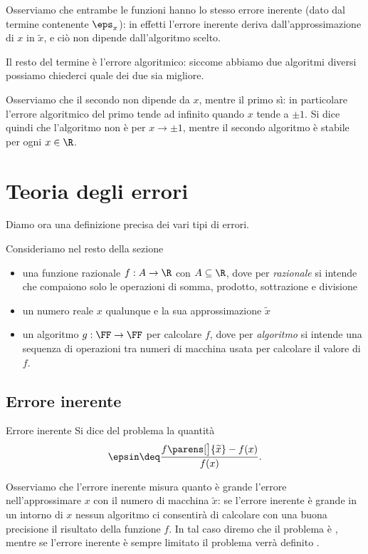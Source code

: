 \begin{example}
Osserviamo che entrambe le funzioni hanno lo stesso errore inerente (dato dal termine contenente $\eps_x$): in effetti l'errore inerente deriva dall'approssimazione di $x$ in $\tilde x$, e ciò non dipende dall'algoritmo scelto.

Il resto del termine è l'errore algoritmico: siccome abbiamo due algoritmi diversi possiamo chiederci quale dei due sia migliore. 

Osserviamo che il secondo non dipende da $x$, mentre il primo sì: in particolare l'errore algoritmico del primo tende ad infinito quando $x$ tende a $\pm 1$. Si dice quindi che l'algoritmo non è  per $x \to \pm 1$, mentre il secondo algoritmo è stabile per ogni $x \in \R$. 
\end{example}

\section{Teoria degli errori}

Diamo ora una definizione precisa dei vari tipi di errori.

Consideriamo nel resto della sezione \begin{itemize}
    \item una funzione razionale $f : A \to \R$ con $A \subseteq \R$, dove per \emph{razionale} si intende che compaiono solo le operazioni di somma, prodotto, sottrazione e divisione
    \item un numero reale $x$ qualunque e la sua approssimazione $\tilde x$
    \item un algoritmo $g : \FF \to \FF$ per calcolare $f$, dove per \emph{algoritmo} si intende una sequenza di operazioni tra numeri di macchina usata per calcolare il valore di $f$.
\end{itemize}

\subsection{Errore inerente}

\begin{definition}{Errore inerente}{}
    Si dice  del problema la quantità \[
        \epsin \deq \frac{f\parens[\big]{\tilde x} - f(x)}{f(x)}.
    \]
\end{definition}

Osserviamo che l'errore inerente misura quanto è grande l'errore nell'approssimare $x$ con il numero di macchina $\tilde x$: se l'errore inerente è grande in un intorno di $x$ nessun algoritmo ci consentirà di calcolare con una buona precisione il risultato della funzione $f$. In tal caso diremo che il problema è , mentre se l'errore inerente è sempre limitato il problema verrà definito .

